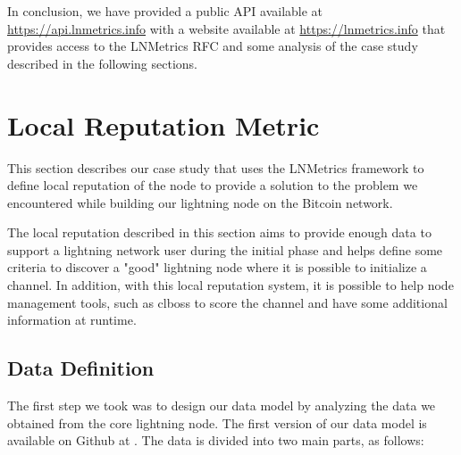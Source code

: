 In conclusion, we have provided a public API available at \url{https://api.lnmetrics.info} 
with a website available at \url{https://lnmetrics.info} that provides access to the 
LNMetrics RFC and some analysis of the case study described in the 
following sections.

\section{Local Reputation Metric}
\label{sec:demo}

This section describes our case study that uses the LNMetrics framework 
to define local reputation of the node to provide a solution to the
problem we encountered while building our lightning node on the
Bitcoin network.

The local reputation described in this section aims to provide enough 
data to support a lightning network user during the initial phase and
helps define some criteria to discover a "good" lightning node where 
it is possible to initialize a channel. In addition, with this local 
reputation system, it is possible to help node management tools, such as
clboss \cite{clboss} to score the channel and have some additional 
information at runtime.


\subsection{Data Definition}
\label{sec:data_definition_datadef}

The first step we took was to design our data model by analyzing the data we 
obtained from the core lightning node. The first version of our data model is 
available on Github at \cite{lnmetrics_localreputation}. The data is divided 
into two main parts, as follows:

